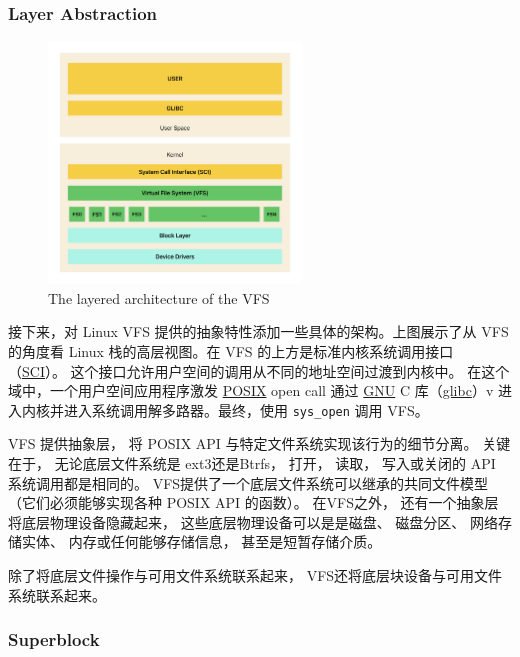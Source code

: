 \documentclass[UTF8,a4paper]{ctexart}
\newcommand{\code}{\texttt}
\begin{document}
\subsubsection{Layer Abstraction}

\begin{figure}[H]
    \centering
    \includegraphics[width=0.6\textwidth]{The layered architecture of the VFS.png}
    \caption{The layered architecture of the VFS}
\end{figure}

接下来，对 Linux VFS 提供的抽象特性添加一些具体的架构。上图展示了从 VFS
的角度看 Linux 栈的高层视图。在 VFS
的上方是标准内核系统调用接口
（\href{https://en.wikipedia.org/wiki/Scalable_Coherent_Interface}{SCI}）。
这个接口允许用户空间的调用从不同的地址空间过渡到内核中。
在这个域中，一个用户空间应用程序激发
\href{https://en.wikipedia.org/wiki/POSIX}{POSIX} open call 通过
\href{https://en.wikipedia.org/wiki/GNU}{GNU} C
库（\href{https://en.wikipedia.org/wiki/Glibc}{glibc}）v
进入内核并进入系统调用解多路器。最终，使用
\code{sys\_open} 调用 VFS。

VFS 提供抽象层，
将 POSIX API
与特定文件系统实现该行为的细节分离。
关键在于，
无论底层文件系统是
ext3还是Btrfs，
打开，
读取，
写入或关闭的 API
系统调用都是相同的。
VFS提供了一个底层文件系统可以继承的共同文件模型
（它们必须能够实现各种
POSIX API
的函数）。
在VFS之外，
还有一个抽象层将底层物理设备隐藏起来，
这些底层物理设备可以是是磁盘、
磁盘分区、
网络存储实体、
内存或任何能够存储信息，
甚至是短暂存储介质。

除了将底层文件操作与可用文件系统联系起来，
VFS还将底层块设备与可用文件系统联系起来。

\subsubsection{Superblock}
\end{document}
